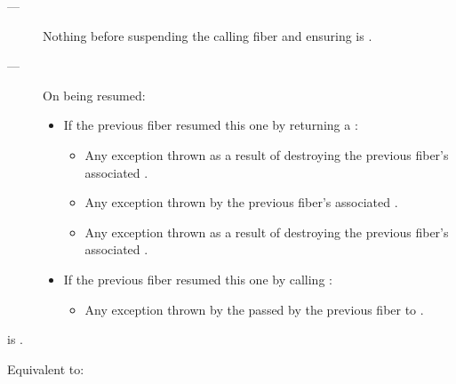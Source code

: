 \except
\begin{description}
    \item[---] Nothing before suspending the calling fiber and
               ensuring \emptyfn is \true.
    \item[---] On being resumed:
    \begin{itemize}
        \item If the previous fiber resumed this one by returning a \fiber:
            \begin{itemize}
                \item Any exception thrown as a result of destroying the
                      previous fiber's associated .
                \item Any exception thrown by the previous fiber's
                      associated .
                \item Any exception thrown as a result of destroying the
                      previous fiber's associated .
            \end{itemize}
        \item If the previous fiber resumed this one by calling \anyresumewith:
        \begin{itemize}
            \item Any exception thrown by the  passed by the previous
                  fiber to \anyresumewith.
        \end{itemize}
    \end{itemize}
\end{description}

\postcond
\emptyfn is \true.




\effects
Equivalent to:\\

